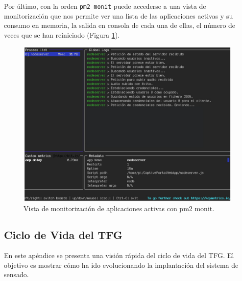 \begin{appendices}

Por último, con la orden \texttt{pm2 monit} puede accederse a una vista de monitorización que nos permite ver una lista de las aplicaciones activas y su consumo en memoria, la salida en consola de cada una de ellas, el número de veces que se han reiniciado (Figura \ref{pm2monit}).

\begin{figure}[!t]
\begin{center}
\includegraphics[width=0.75\linewidth]{./X_Anexos/Img/pm2monit.png}
\end{center}
\caption{Vista de monitorización de aplicaciones activas con pm2 monit.}
\label{pm2monit}
\end{figure}
\clearpage
{}%
\begin{center}
\begin{minipage}{.75\textwidth}
\section{Ciclo de Vida del TFG}\label{ApendiceD}

En este apéndice se presenta una visión rápida del ciclo de vida del TFG. El objetivo es mostrar cómo ha ido evolucionando la implantación del sistema de sensado.
\end{minipage}
\end{center}
\clearpage%


\end{appendices}
